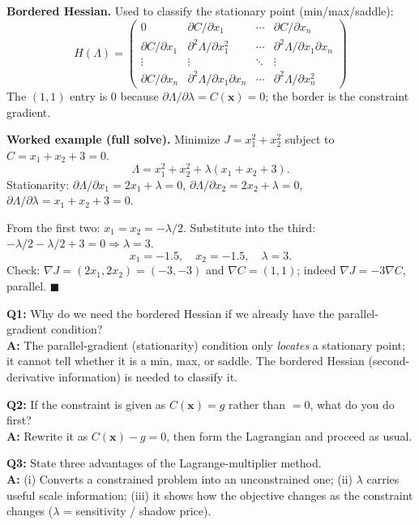 \textbf{Bordered Hessian.} Used to classify the stationary point (min/max/saddle):
\[
H(\Lambda)=\begin{pmatrix}0 & \partial C/\partial x_1 & \cdots & \partial C/\partial x_n\\ \partial C/\partial x_1 & \partial^2\Lambda/\partial x_1^2 & \cdots & \partial^2 \Lambda/\partial x_1\partial x_n\\ \vdots&\vdots&\ddots&\vdots \\ \partial C/\partial x_n & \partial^2\Lambda/\partial x_1\partial x_n & \cdots & \partial^2\Lambda/\partial x_n^2\end{pmatrix}
\]
The $(1,1)$ entry is $0$ because $\partial \Lambda/\partial \lambda = C(\mathbf x)=0$; the border is the constraint gradient.

\begin{examplebox}
\textbf{Worked example (full solve).} Minimize $J=x_1^2+x_2^2$ subject to $C=x_1+x_2+3=0$.
\[
\Lambda = x_1^2+x_2^2+\lambda(x_1+x_2+3).
\]
Stationarity: $\partial\Lambda/\partial x_1 = 2x_1+\lambda=0$, $\partial\Lambda/\partial x_2=2x_2+\lambda=0$, $\partial \Lambda/\partial\lambda = x_1+x_2+3=0$.

From the first two: $x_1=x_2=-\lambda/2$. Substitute into the third: $-\lambda/2-\lambda/2+3=0\Rightarrow \lambda=3$.
\[
x_1=-1.5,\quad x_2=-1.5,\quad \lambda=3.
\]
Check: $\nabla J=(2x_1,2x_2)=(-3,-3)$ and $\nabla C=(1,1)$; indeed $\nabla J = -3\nabla C$, parallel. $\blacksquare$
\end{examplebox}

\begin{qabox}
\textbf{Q1:} Why do we need the bordered Hessian if we already have the parallel-gradient condition? \\
\textbf{A:} The parallel-gradient (stationarity) condition only \emph{locates} a stationary point; it cannot tell whether it is a min, max, or saddle. The bordered Hessian (second-derivative information) is needed to classify it.

\textbf{Q2:} If the constraint is given as $C(\mathbf x)=g$ rather than $=0$, what do you do first? \\
\textbf{A:} Rewrite it as $C(\mathbf x)-g=0$, then form the Lagrangian and proceed as usual.

\textbf{Q3:} State three advantages of the Lagrange-multiplier method. \\
\textbf{A:} (i) Converts a constrained problem into an unconstrained one; (ii) $\lambda$ carries useful scale information; (iii) it shows how the objective changes as the constraint changes ($\lambda$ = sensitivity / shadow price).
\end{qabox}
